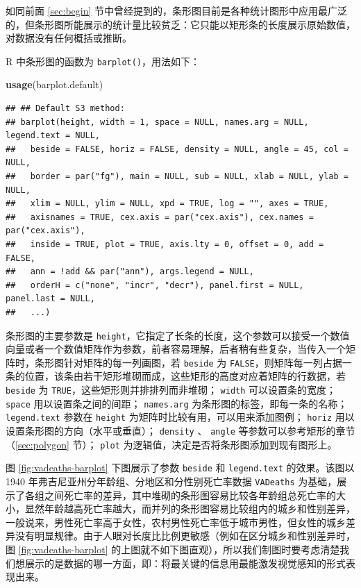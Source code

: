 \documentclass[
  b5paper,
  UTF8,twoside]{book}
\newenvironment{Shaded}{\begin{snugshade}}{\end{snugshade}}
\newcommand{\FunctionTok}[1]{\textcolor[rgb]{0.13,0.29,0.53}{\textbf{#1}}}
\newcommand{\NormalTok}[1]{#1}
\newcounter{none} %
\begin{document}
如同前面 \ref{sec:begin} 节中曾经提到的，条形图目前是各种统计图形中应用最广泛的，但条形图所能展示的统计量比较贫乏：它只能以矩形条的长度展示原始数值，对数据没有任何概括或推断。

R 中条形图的函数为 \texttt{barplot()}，用法如下：

\begin{Shaded}
\begin{Highlighting}[]
\FunctionTok{usage}\NormalTok{(barplot.default)}
\end{Highlighting}
\end{Shaded}

\begin{verbatim}
## ## Default S3 method:
## barplot(height, width = 1, space = NULL, names.arg = NULL, legend.text = NULL,
##   beside = FALSE, horiz = FALSE, density = NULL, angle = 45, col = NULL,
##   border = par("fg"), main = NULL, sub = NULL, xlab = NULL, ylab = NULL,
##   xlim = NULL, ylim = NULL, xpd = TRUE, log = "", axes = TRUE,
##   axisnames = TRUE, cex.axis = par("cex.axis"), cex.names = par("cex.axis"),
##   inside = TRUE, plot = TRUE, axis.lty = 0, offset = 0, add = FALSE,
##   ann = !add && par("ann"), args.legend = NULL,
##   orderH = c("none", "incr", "decr"), panel.first = NULL, panel.last = NULL,
##   ...)
\end{verbatim}

条形图的主要参数是 \texttt{height}，它指定了长条的长度，这个参数可以接受一个数值向量或者一个数值矩阵作为参数，前者容易理解，后者稍有些复杂，当传入一个矩阵时，条形图针对矩阵的每一列画图，若 \texttt{beside} 为 \texttt{FALSE}，则矩阵每一列占据一条的位置，该条由若干矩形堆砌而成，这些矩形的高度对应着矩阵的行数据，若 \texttt{beside} 为 \texttt{TRUE}，这些矩形则并排排列而非堆砌； \texttt{width} 可以设置条的宽度； \texttt{space} 用以设置条之间的间距； \texttt{names.arg} 为条形图的标签，即每一条的名称； \texttt{legend.text} 参数在 \texttt{height} 为矩阵时比较有用，可以用来添加图例； \texttt{horiz} 用以设置条形图的方向（水平或垂直）； \texttt{density} 、 \texttt{angle} 等参数可以参考矩形的章节（\ref{sec:polygon} 节）； \texttt{plot} 为逻辑值，决定是否将条形图添加到现有图形上。

图 \ref{fig:vadeaths-barplot}
下图展示了参数 \texttt{beside} 和 \texttt{legend.text} 的效果。该图以 1940 年弗吉尼亚州分年龄组、分地区和分性别死亡率数据 \texttt{VADeaths} 为基础，展示了各组之间死亡率的差异，其中堆砌的条形图容易比较各年龄组总死亡率的大小，显然年龄越高死亡率越大，而并列的条形图容易比较组内的城乡和性别差异，一般说来，男性死亡率高于女性，农村男性死亡率低于城市男性，但女性的城乡差异没有明显规律。由于人眼对长度比比例更敏感（例如在区分城乡和性别差异时，图 \ref{fig:vadeaths-barplot}
的上图就不如下图直观），所以我们制图时要考虑清楚我们想展示的是数据的哪一方面，即：将最关键的信息用最能激发视觉感知的形式表现出来。
\end{document}
